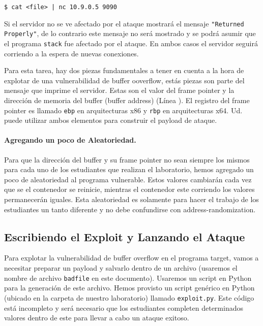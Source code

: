 \begin{lstlisting}
$ cat <file> | nc 10.9.0.5 9090
\end{lstlisting}

Si el servidor no se ve afectado por el ataque mostrará el mensaje \texttt{"Returned Properly"}, de lo contrario este mensaje no será mostrado y se podrá asumir que el programa 
\texttt{stack} fue afectado por el ataque.
En ambos casos el servidor seguirá corriendo a la espera de nuevas conexiones.

Para esta tarea, hay dos piezas fundamentales a tener en cuenta a la hora de explotar de una vulnerabilidad de buffer ooverflow, estás piezas son parte del mensaje que imprime el servidor.
Estas son el valor del frame pointer y la dirección de memoria del buffer (buffer address) (Línea ). El registro del frame pointer es llamado \texttt{ebp} en arquitecturas x86 y \texttt{rbp} en arquitecturas x64.
Ud. puede utilizar ambos elementos para construir el payload de ataque.

\paragraph{Agregando un poco de Aleatoriedad.} Para que la dirección del buffer y su frame pointer no sean siempre los mismos para cada uno de los estudiantes que realizan el laboratorio, hemos agregado un poco de aleatoriedad al programa vulnerable. Estos valores cambiarán cada vez que se el contenedor se reinicie, mientras el contenedor este corriendo los valores permanecerán iguales. Esta aleatoriedad es solamente para hacer el trabajo de los estudiantes un tanto diferente y no debe confundirse con address-randomization.


\subsection{Escribiendo el Exploit y Lanzando el Ataque} 

Para explotar la vulnerabilidad de buffer overflow en el programa target, vamos a necesitar preparar un payload y salvarlo dentro de un archivo (usaremos el nombre de archivo \texttt{badfile} en este documento).
Usaremos un script en Python para la generación de este archivo. 
Hemos provisto un script genérico en Python (ubicado en la carpeta de nuestro laboratorio) llamado \texttt{exploit.py}.
Este código está incompleto y será necesario que los estudiantes completen determinados valores dentro de este para llevar a cabo un ataque exitoso.


